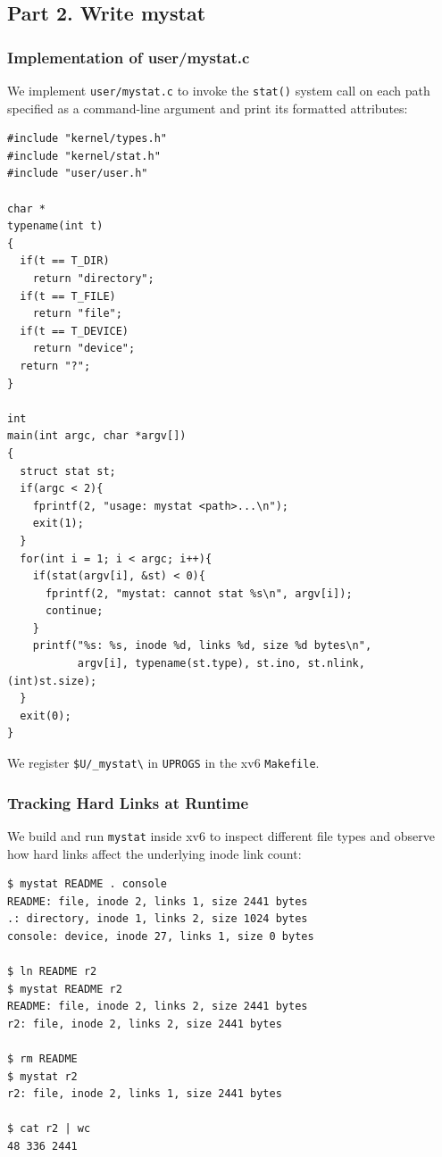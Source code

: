 \documentclass{labreport}
\begin{document}
\subsection{Part 2. Write mystat}

\subsubsection{Implementation of user/mystat.c}
We implement \texttt{user/mystat.c} to invoke the \texttt{stat()} system call on each path specified as a command-line argument and print its formatted attributes:

\begin{lstlisting}[style=c]
#include "kernel/types.h"
#include "kernel/stat.h"
#include "user/user.h"

char *
typename(int t)
{
  if(t == T_DIR)
    return "directory";
  if(t == T_FILE)
    return "file";
  if(t == T_DEVICE)
    return "device";
  return "?";
}

int
main(int argc, char *argv[])
{
  struct stat st;
  if(argc < 2){
    fprintf(2, "usage: mystat <path>...\n");
    exit(1);
  }
  for(int i = 1; i < argc; i++){
    if(stat(argv[i], &st) < 0){
      fprintf(2, "mystat: cannot stat %s\n", argv[i]);
      continue;
    }
    printf("%s: %s, inode %d, links %d, size %d bytes\n",
           argv[i], typename(st.type), st.ino, st.nlink, (int)st.size);
  }
  exit(0);
}
\end{lstlisting}
We register \texttt{\$U/\_mystat\textbackslash} in \texttt{UPROGS} in the xv6 \texttt{Makefile}.

\subsubsection{Tracking Hard Links at Runtime}
We build and run \texttt{mystat} inside xv6 to inspect different file types and observe how hard links affect the underlying inode link count:

\begin{lstlisting}[style=bash]
$ mystat README . console
README: file, inode 2, links 1, size 2441 bytes
.: directory, inode 1, links 2, size 1024 bytes
console: device, inode 27, links 1, size 0 bytes

$ ln README r2
$ mystat README r2
README: file, inode 2, links 2, size 2441 bytes
r2: file, inode 2, links 2, size 2441 bytes

$ rm README
$ mystat r2
r2: file, inode 2, links 1, size 2441 bytes

$ cat r2 | wc
48 336 2441
\end{lstlisting}
\end{document}
